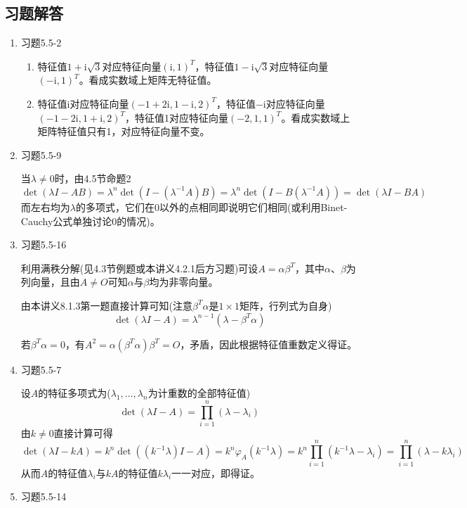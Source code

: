 \documentclass[a4paper,UTF8,fontset=windows]{ctexart}
\newcommand*{\ir}{\mathrm{i}}
\begin{document}
\subsection{习题解答}
\begin{enumerate}
    \item 习题5.5-2
    \begin{enumerate}[(1)]
        \item 特征值$1+\ir\sqrt{3}$对应特征向量$(\ir,1)^T$，特征值$1-\ir\sqrt{3}$对应特征向量$(-\ir,1)^T$。看成实数域上矩阵无特征值。
        
        \item 特征值$\ir$对应特征向量$(-1+2\ir,1-\ir,2)^T$，特征值$-\ir$对应特征向量$(-1-2\ir,1+\ir,2)^T$，特征值1对应特征向量$(-2,1,1)^T$。看成实数域上矩阵特征值只有1，对应特征向量不变。
    \end{enumerate}


    \item 习题5.5-9
    
    当$\lambda\ne0$时，由4.5节命题2
    $$\det(\lambda I-AB)=\lambda^n\det(I-(\lambda^{-1}A)B)=\lambda^n\det(I-B(\lambda^{-1}A))=\det(\lambda I-BA)$$
    而左右均为$\lambda$的多项式，它们在0以外的点相同即说明它们相同(或利用Binet-Cauchy公式单独讨论0的情况)。

    \item 习题5.5-16
    
    利用满秩分解(见4.3节例题或本讲义4.2.1后方习题)可设$A=\alpha\beta^T$，其中$\alpha$、$\beta$为列向量，且由$A\ne O$可知$\alpha$与$\beta$均为非零向量。

    由本讲义8.1.3第一题直接计算可知(注意$\beta^T\alpha$是$1\times 1$矩阵，行列式为自身)
    $$\det(\lambda I-A)=\lambda^{n-1}(\lambda-\beta^T\alpha)$$

    若$\beta^T\alpha=0$，有$A^2=\alpha(\beta^T\alpha)\beta^T=O$，矛盾，因此根据特征值重数定义得证。

    \item 习题5.5-7
    
    设$A$的特征多项式为($\lambda_1,\dots,\lambda_n$为计重数的全部特征值)
    $$\det(\lambda I-A)=\prod_{i=1}^n(\lambda-\lambda_i)$$
    由$k\ne0$直接计算可得
    $$\det(\lambda I-kA)=k^n\det((k^{-1}\lambda)I-A)=k^n\varphi_A(k^{-1}\lambda)=k^n\prod_{i=1}^n(k^{-1}\lambda-\lambda_i)=\prod_{i=1}^n(\lambda-k\lambda_i)$$
    从而$A$的特征值$\lambda_i$与$kA$的特征值$k\lambda_i$一一对应，即得证。

    \item 习题5.5-14
    

\end{enumerate}
\end{document}
